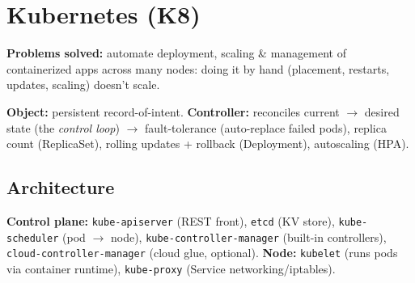 \section{Kubernetes (K8)}
\textbf{Problems solved:} automate deployment, scaling \& management of containerized apps across many nodes: doing it by hand (placement, restarts, updates, scaling) doesn't scale.
\begin{mdframed}
  \textbf{Object:} persistent record-of-intent. \textbf{Controller:} reconciles current $\rightarrow$ desired state (the \textit{control loop}) $\to$ fault-tolerance (auto-replace failed pods), replica count (ReplicaSet), rolling updates + rollback (Deployment), autoscaling (HPA).
\end{mdframed}

\subsection{Architecture}
\textbf{Control plane:} \texttt{kube-apiserver} (REST front), \texttt{etcd} (KV store), \texttt{kube-scheduler} (pod $\rightarrow$ node), \texttt{kube-controller-manager} (built-in controllers), \texttt{cloud-controller-manager} (cloud glue, optional). \textbf{Node:} \texttt{kubelet} (runs pods via container runtime), \texttt{kube-proxy} (Service networking/iptables).


